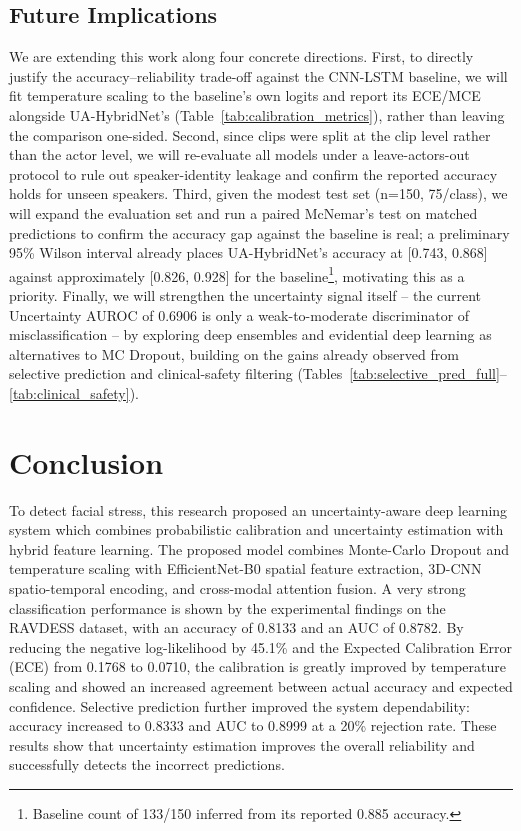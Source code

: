 \documentclass[conference]{IEEEtran}
\begin{document}
\subsection{Future Implications}

We are extending this work along four concrete directions. First, to directly justify the accuracy--reliability trade-off against the CNN-LSTM baseline, we will fit temperature scaling to the baseline's own logits and report its ECE/MCE alongside UA-HybridNet's (Table~\ref{tab:calibration_metrics}), rather than leaving the comparison one-sided. Second, since clips were split at the clip level rather than the actor level, we will re-evaluate all models under a leave-actors-out protocol to rule out speaker-identity leakage and confirm the reported accuracy holds for unseen speakers. Third, given the modest test set (n=150, 75/class), we will expand the evaluation set and run a paired McNemar's test on matched predictions to confirm the accuracy gap against the baseline is real; a preliminary 95\% Wilson interval already places UA-HybridNet's accuracy at [0.743, 0.868] against approximately [0.826, 0.928] for the baseline\footnote{Baseline count of 133/150 inferred from its reported 0.885 accuracy.}, motivating this as a priority. Finally, we will strengthen the uncertainty signal itself -- the current Uncertainty AUROC of 0.6906 is only a weak-to-moderate discriminator of misclassification -- by exploring deep ensembles and evidential deep learning as alternatives to MC Dropout, building on the gains already observed from selective prediction and clinical-safety filtering (Tables~\ref{tab:selective_pred_full}--\ref{tab:clinical_safety}).

\section{Conclusion}


To detect facial stress, this research proposed an uncertainty-aware deep learning system which combines probabilistic calibration and uncertainty estimation with hybrid feature learning. The proposed model combines Monte-Carlo Dropout and temperature scaling with EfficientNet-B0 spatial feature extraction, 3D-CNN spatio-temporal encoding, and cross-modal attention fusion. A very strong classification performance is shown by the experimental findings on the RAVDESS dataset, with an accuracy of 0.8133 and an AUC of 0.8782. By reducing the negative log-likelihood by 45.1\% and the Expected Calibration Error (ECE) from 0.1768 to 0.0710, the calibration is greatly improved by temperature scaling and showed an increased agreement between actual accuracy and expected confidence.
Selective prediction further improved the system dependability: accuracy increased to 0.8333 and AUC to 0.8999 at a 20\% rejection rate. These results show that uncertainty estimation improves the overall reliability and successfully detects the incorrect predictions. 
\end{document}
